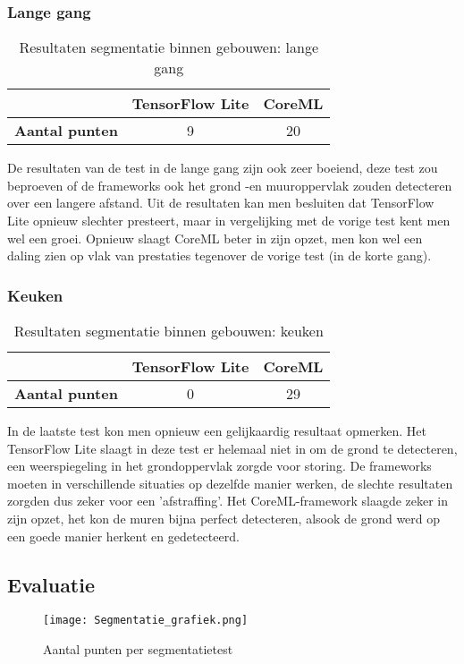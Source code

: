 \subsubsection{Lange gang}
\begin{table}[H]
	\centering
	\begin{tabular}{|c|c|c|}
		\hline
		& \textbf{TensorFlow Lite} & \textbf{CoreML} \\ \hline
		\textbf{Aantal punten} & 9                        & 20              \\ \hline
	\end{tabular}
	\caption{Resultaten segmentatie binnen gebouwen: lange gang}
\end{table}
De resultaten van de test in de lange gang zijn ook zeer boeiend, deze test zou beproeven of de frameworks ook het grond -en muuroppervlak zouden detecteren over een langere afstand. Uit de resultaten kan men besluiten dat TensorFlow Lite opnieuw slechter presteert, maar in vergelijking met de vorige test kent men wel een groei. Opnieuw slaagt CoreML beter in zijn opzet, men kon wel een daling zien op vlak van prestaties tegenover de vorige test (in de korte gang).

\subsubsection{Keuken}
\begin{table}[H]
	\centering
	\begin{tabular}{|c|c|c|}
		\hline
		& \textbf{TensorFlow Lite} & \textbf{CoreML} \\ \hline
		\textbf{Aantal punten} & 0                        & 29              \\ \hline
	\end{tabular}
	\caption{Resultaten segmentatie binnen gebouwen: keuken}
\end{table}
In de laatste test kon men opnieuw een gelijkaardig resultaat opmerken. Het TensorFlow Lite slaagt in deze test er helemaal niet in om de grond te detecteren, een weerspiegeling in het grondoppervlak zorgde voor storing. De frameworks moeten in verschillende situaties op dezelfde manier werken, de slechte resultaten zorgden dus zeker voor een 'afstraffing'. Het CoreML-framework slaagde zeker in zijn opzet, het kon de muren bijna perfect detecteren, alsook de grond werd op een goede manier  herkent en gedetecteerd.

\subsection{Evaluatie}
\begin{figure}[H]
	\centering
	\texttt{[image: Segmentatie\_grafiek.png]}
	\caption{Aantal punten per segmentatietest}
\end{figure}



